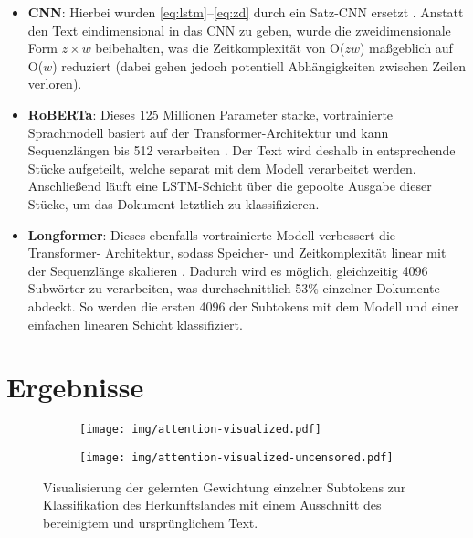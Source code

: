 \documentclass[bachelor,german]{info1thesis}
\begin{document}
\begin{itemize}
\item \textbf{CNN}: Hierbei wurden \autoref{eq:lstm}--\ref{eq:zd} durch ein Satz-CNN ersetzt \cite{Kim2014}. Anstatt den Text eindimensional in das CNN zu geben, wurde die zweidimensionale Form $z \times w$ beibehalten, was die Zeitkomplexität von O($zw$) maßgeblich auf O($w$) reduziert (dabei gehen jedoch potentiell Abhängigkeiten zwischen Zeilen verloren).
\item \textbf{RoBERTa}: Dieses 125 Millionen Parameter starke, vortrainierte Sprachmodell basiert auf der Transformer-Architektur und kann Sequenzlängen bis 512 verarbeiten \cite{Liu2019}. Der Text wird deshalb in entsprechende Stücke aufgeteilt, welche separat mit dem Modell verarbeitet werden. Anschließend läuft eine LSTM-Schicht über die gepoolte Ausgabe dieser Stücke, um das Dokument letztlich zu klassifizieren.
\item \textbf{Longformer}: Dieses ebenfalls vortrainierte Modell verbessert die Transformer- Architektur, sodass Speicher- und Zeitkomplexität linear mit der Sequenzlänge skalieren \cite{Beltagy2020}. Dadurch wird es möglich, gleichzeitig 4096 Subwörter zu verarbeiten, was durchschnittlich 53\% einzelner Dokumente abdeckt. So werden die ersten 4096 der Subtokens mit dem Modell und einer einfachen linearen Schicht klassifiziert. 
\end{itemize}
%


\chapter{Ergebnisse}

\begin{figure}
     \centering
     \begin{subfigure}[b]{0.8\textwidth}
         \centering
         \texttt{[image: img/attention-visualized.pdf]}
         \label{fig:visualized-cleaned-text}
     \end{subfigure}
     \begin{subfigure}[b]{0.8\textwidth}
         \centering
         \vspace{.5em}
         \texttt{[image: img/attention-visualized-uncensored.pdf]}
         \label{fig:visualized-original-text}
     \end{subfigure}
     \caption{Visualisierung der gelernten Gewichtung einzelner Subtokens zur Klassifikation des Herkunftslandes mit einem Ausschnitt des bereinigtem und ursprünglichem Text.}
     \label{fig:visualized-texts}
\end{figure}
\end{document}
